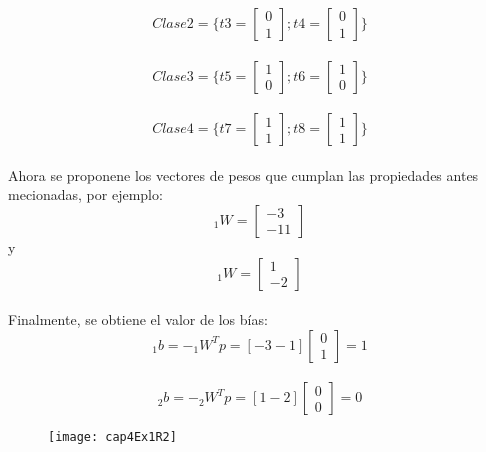 \documentclass{article}
\begin{document}
\[Clase 2 = \{ t3 =
\begin{bmatrix}
0\\
1
\end{bmatrix};
t4 = 
\begin{bmatrix}
0\\
1
\end{bmatrix}
\}
\]\\

\[Clase 3 = \{ t5 =
\begin{bmatrix}
1\\
0
\end{bmatrix};
t6 = 
\begin{bmatrix}
1\\
0
\end{bmatrix}
\}
\]\\

\[Clase 4= \{ t7 =
\begin{bmatrix}
1\\
1
\end{bmatrix};
t8 = 
\begin{bmatrix}
1\\
1
\end{bmatrix}
\}
\]\\

Ahora se proponene los vectores de pesos que cumplan las propiedades antes mecionadas, por ejemplo:\\
\[_1W= 
\begin{bmatrix}
-3\\
-11
\end{bmatrix}
\]
 y 
 \[_1W= 
\begin{bmatrix}
1\\
-2
\end{bmatrix}
\]\\

Finalmente, se obtiene el valor de los bías:
\[_1b= -_1W^Tp=[-3 -1] 
\begin{bmatrix}
0\\
1
\end{bmatrix}=1
\]\\

\[_2b= -_2W^Tp=[1 -2] 
\begin{bmatrix}
0\\
0
\end{bmatrix}=0
\]
\begin{figure}[h!]
	\centering
	\texttt{[image: cap4Ex1R2]}
\end{figure}
\end{document}
